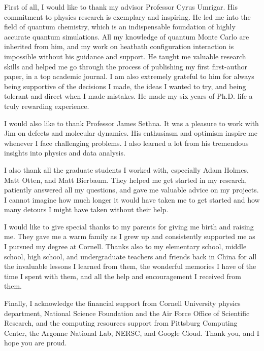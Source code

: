\documentclass[phd,tocprelim]{cornell}
\begin{document}
\begin{acknowledgements}
First of all, I would like to thank my advisor Professor Cyrus Umrigar.
His commitment to physics research is exemplary and inspiring.
He led me into the field of quantum chemistry, which is an indispensable foundation of highly accurate quantum simulations.
All my knowledge of quantum Monte Carlo are inherited from him, and my work on heatbath configuration interaction is impossible without his guidance and support.
He taught me valuable research skills and helped me go through the process of publishing my first first-author paper, in a top academic journal.
I am also extremely grateful to him for always being supportive of the decisions I made, the ideas I wanted to try, and being tolerant and direct when I made mistakes.
He made my six years of Ph.D. life a truly rewarding experience.

I would also like to thank Professor James Sethna.
It was a pleasure to work with Jim on defects and molecular dynamics.
His enthusiasm and optimism inspire me whenever I face challenging problems.
I also learned a lot from his tremendous insights into physics and data analysis.

I also thank all the graduate students I worked with, especially Adam Holmes, Matt Otten, and Matt Bierbaum.
They helped me get started in my research, patiently answered all my questions, and gave me valuable advice on my projects.
I cannot imagine how much longer it would have taken me to get started and how many detours I might have taken without their help.

I would like to give special thanks to my parents for giving me birth and raising me.
They gave me a warm family as I grew up and consistently supported me as I pursued my degree at Cornell.
Thanks also to my elementary school, middle school, high school, and undergraduate teachers and friends back in China for all the invaluable lessons I learned from them, the wonderful memories I have of the time I spent with them, and all the help and encouragement I received from them.

Finally, I acknowledge the financial support from Cornell University physics department, National Science Foundation and the Air Force Office of Scientific Research, and the computing resources support from Pittsburg Computing Center, the Argonne National Lab, NERSC, and Google Cloud.
Thank you, and I hope you are proud.
\end{acknowledgements}

\contentspage
\tablelistpage
\figurelistpage
\end{document}

